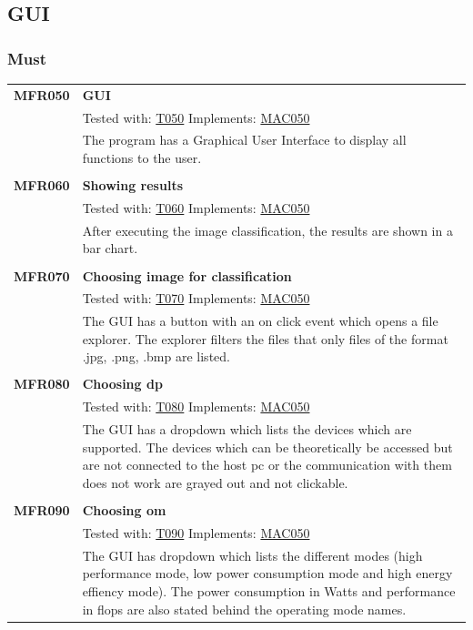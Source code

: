 \documentclass[parskip=full]{scrartcl}
\begin{document}
\subsection{GUI}
\subsubsection{Must}
\begin{tabular}{p{2cm}p{11.4cm}}
\textbf {MFR050} \hypertarget{MFR050}& \textbf{GUI} \\
& Tested with: \hyperlink{T050}{T050} Implements: \hyperlink{MAC050}{MAC050} \\
& The program has a Graphical User Interface to display all functions to the user. \\
& \\
\textbf {MFR060}\hypertarget{MFR060}  & \textbf{Showing results} \\
& Tested with: \hyperlink{T060}{T060} Implements: \hyperlink{MAC050}{MAC050} \\
& After executing the \gls{image classification}, the results are shown in a bar chart. \\
& \\
\textbf{MFR070} \hypertarget{MFR070}& \textbf{Choosing image for classification}\\
& Tested with: \hyperlink{T070}{T070} Implements: \hyperlink{MAC050}{MAC050} \\
& The GUI has a button with an on click event which opens a file explorer. The explorer filters the files that only files of the format .jpg, .png, .bmp are listed.\\
& \\
\textbf{MFR080} \hypertarget{MFR080}& \textbf{Choosing \gls{dp}}\\
& Tested with: \hyperlink{T080}{T080} Implements: \hyperlink{MAC050}{MAC050} \\
& The GUI has a dropdown which lists the devices which are supported. The devices which can be theoretically be accessed but are not connected to the \gls{host pc} or the communication with them does not work are grayed out and not clickable. \\
& \\
\textbf{MFR090}\hypertarget{MFR090} & \textbf{Choosing \gls{om}}\\
& Tested with: \hyperlink{T090}{T090} Implements: \hyperlink{MAC050}{MAC050}  \\
& The GUI has dropdown which lists the different modes (high \gls{performance} mode, low \gls{power consumption} mode and high energy effiency mode). The \gls{power consumption} in Watts and \gls{performance} in \gls{flops} are also stated behind the operating mode names.
\end{tabular}
\end{document}
